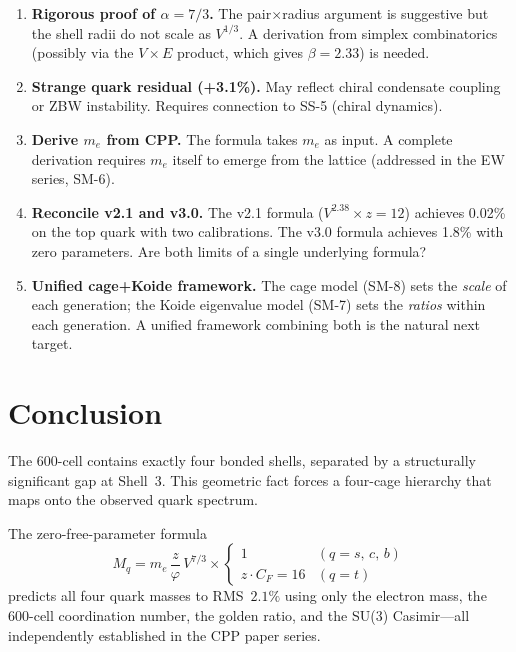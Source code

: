 \documentclass[11pt,letterpaper]{article}
\newcommand{\phig}{\varphi}
\begin{document}
\begin{enumerate}
\item \textbf{Rigorous proof of $\alpha = 7/3$.}
  The pair$\times$radius argument is suggestive but the shell
  radii do not scale as $V^{1/3}$.  A derivation from simplex
  combinatorics (possibly via the $V \times E$ product, which
  gives $\beta = 2.33$) is needed.

\item \textbf{Strange quark residual (+3.1\%).}
  May reflect chiral condensate coupling or ZBW instability.
  Requires connection to SS-5 (chiral dynamics).

\item \textbf{Derive $m_e$ from CPP.}
  The formula takes $m_e$ as input.  A complete derivation requires
  $m_e$ itself to emerge from the lattice (addressed in the EW
  series, SM-6).

\item \textbf{Reconcile v2.1 and v3.0.}
  The v2.1 formula ($V^{2.38} \times z = 12$) achieves 0.02\%
  on the top quark with two calibrations.  The v3.0 formula
  achieves 1.8\% with zero parameters.  Are both limits of a
  single underlying formula?

\item \textbf{Unified cage+Koide framework.}
  The cage model (SM-8) sets the \emph{scale} of each generation;
  the Koide eigenvalue model (SM-7) sets the \emph{ratios} within
  each generation.  A unified framework combining both is the
  natural next target.
\end{enumerate}

\section{Conclusion}
\label{sec:conclusion}

The 600-cell contains exactly four bonded shells, separated by a
structurally significant gap at Shell~3.  This geometric fact
forces a four-cage hierarchy that maps onto the observed quark
spectrum.

The zero-free-parameter formula
\[
  M_q = m_e \,\frac{z}{\phig}\, V^{7/3}
  \times
  \begin{cases}
    1 & (q = s,\, c,\, b)\\
    z \cdot C_F = 16 & (q = t)
  \end{cases}
\]
predicts all four quark masses to RMS~$2.1\%$ using only the
electron mass, the 600-cell coordination number, the golden ratio,
and the SU(3) Casimir---all independently established in the CPP
paper series.
\end{document}
